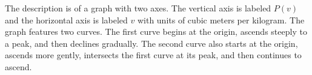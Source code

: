 The description is of a graph with two axes. The vertical axis is labeled \( P(v) \) and the horizontal axis is labeled \( v \) with units of cubic meters per kilogram. The graph features two curves. The first curve begins at the origin, ascends steeply to a peak, and then declines gradually. The second curve also starts at the origin, ascends more gently, intersects the first curve at its peak, and then continues to ascend.